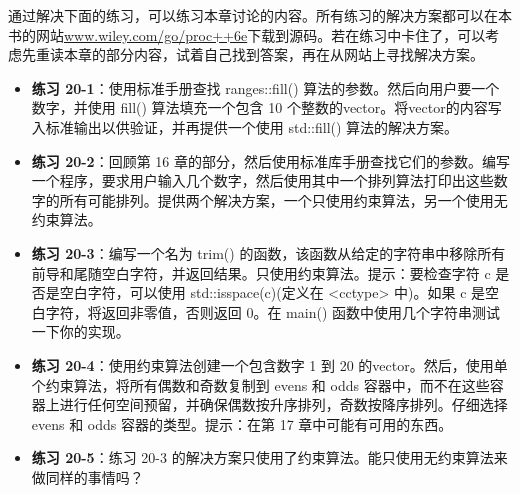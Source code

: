 通过解决下面的练习，可以练习本章讨论的内容。所有练习的解决方案都可以在本书的网站\url{www.wiley.com/go/proc++6e}下载到源码。若在练习中卡住了，可以考虑先重读本章的部分内容，试着自己找到答案，再在从网站上寻找解决方案。

\begin{itemize}
\item
\textbf{练习 20-1}：使用标准手册查找 ranges::fill() 算法的参数。然后向用户要一个数字，并使用 fill() 算法填充一个包含 10 个整数的vector。将vector的内容写入标准输出以供验证，并再提供一个使用 std::fill() 算法的解决方案。

\item
\textbf{练习 20-2}：回顾第 16 章的部分，然后使用标准库手册查找它们的参数。编写一个程序，要求用户输入几个数字，然后使用其中一个排列算法打印出这些数字的所有可能排列。提供两个解决方案，一个只使用约束算法，另一个使用无约束算法。

\item
\textbf{练习 20-3}：编写一个名为 trim() 的函数，该函数从给定的字符串中移除所有前导和尾随空白字符，并返回结果。只使用约束算法。提示：要检查字符 c 是否是空白字符，可以使用 std::isspace(c)(定义在 <cctype> 中)。如果 c 是空白字符，将返回非零值，否则返回 0。在 main() 函数中使用几个字符串测试一下你的实现。

\item
\textbf{练习 20-4}：使用约束算法创建一个包含数字 1 到 20 的vector。然后，使用单个约束算法，将所有偶数和奇数复制到 evens 和 odds 容器中，而不在这些容器上进行任何空间预留，并确保偶数按升序排列，奇数按降序排列。仔细选择 evens 和 odds 容器的类型。提示：在第 17 章中可能有可用的东西。

\item
\textbf{练习 20-5}：练习 20-3 的解决方案只使用了约束算法。能只使用无约束算法来做同样的事情吗？
\end{itemize}












